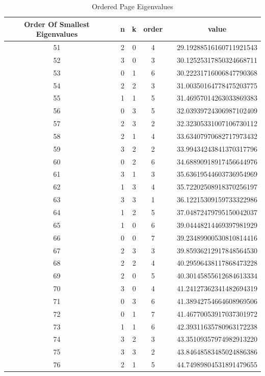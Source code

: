 \documentclass{article}
\begin{document}
\begin{table}[htbp]
\caption{Ordered Page Eigenvalues}
\label{ }
\begin{tabular}{c|c|c|c|c|c|c}
\toprule
Order Of Smallest Eigenvalues &   & n & k & order &   & value \\
\midrule
51 &   & 2 & 0 & 4 &   & 29.19288516160711921543 \\
52 &   & 3 & 0 & 3 &   & 30.12525317850324668711 \\
53 &   & 0 & 1 & 6 &   & 30.22231716006847790368 \\
54 &   & 2 & 2 & 3 &   & 31.00350164778475203775 \\
55 &   & 1 & 1 & 5 &   & 31.46957014263033869383 \\
56 &   & 0 & 3 & 5 &   & 32.03939724306987102409 \\
57 &   & 2 & 3 & 2 &   & 32.32305331007106730112 \\
58 &   & 2 & 1 & 4 &   & 33.63407970682717973432 \\
59 &   & 3 & 2 & 2 &   & 33.99434243841370317796 \\
60 &   & 0 & 2 & 6 &   & 34.68890918917456644976 \\
61 &   & 3 & 1 & 3 &   & 35.63619544603736954969 \\
62 &   & 1 & 3 & 4 &   & 35.72202508918370256197 \\
63 &   & 3 & 3 & 1 &   & 36.12215309159733322986 \\
64 &   & 1 & 2 & 5 &   & 37.04872479795150042037 \\
65 &   & 1 & 0 & 6 &   & 39.04448214469397981929 \\
66 &   & 0 & 0 & 7 &   & 39.23489900530810814416 \\
67 &   & 2 & 3 & 3 &   & 39.85936212917848564530 \\
68 &   & 2 & 2 & 4 &   & 40.29596438117868473228 \\
69 &   & 2 & 0 & 5 &   & 40.30145855612684613334 \\
70 &   & 3 & 0 & 4 &   & 41.24127362341482694319 \\
71 &   & 0 & 3 & 6 &   & 41.38942754664608969506 \\
72 &   & 0 & 1 & 7 &   & 41.46770053917037301972 \\
73 &   & 1 & 1 & 6 &   & 42.39311635780963172238 \\
74 &   & 3 & 2 & 3 &   & 43.35109357974982913220 \\
75 &   & 3 & 3 & 2 &   & 43.84648583485024886386 \\
76 &   & 2 & 1 & 5 &   & 44.74989804531891479655 \\

\end{tabular}
\end{table}
\end{document}
